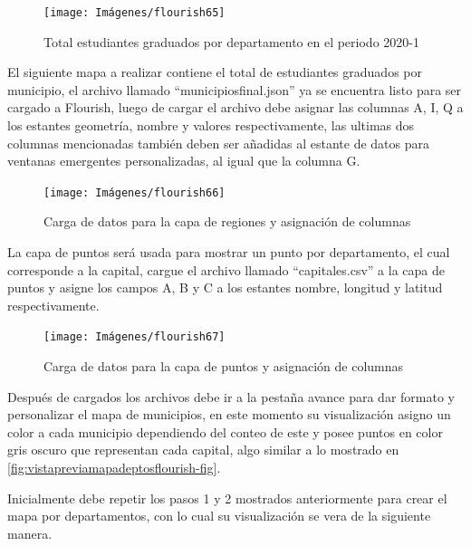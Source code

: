 \documentclass[
]{book}
\begin{document}
\begin{figure}

{\centering \texttt{[image: Imágenes/flourish65]} 

}

\caption{Total estudiantes graduados por departamento en el periodo 2020-1}\label{fig:mapadeptosflourish-fig}
\end{figure}

El siguiente mapa a realizar contiene el total de estudiantes graduados por municipio, el archivo llamado ``municipiosfinal.json'' ya se encuentra listo para ser cargado a Flourish, luego de cargar el archivo debe asignar las columnas A, I, Q a los estantes geometría, nombre y valores respectivamente, las ultimas dos columnas mencionadas también deben ser añadidas al estante de datos para ventanas emergentes personalizadas, al igual que la columna G.

\begin{figure}

{\centering \texttt{[image: Imágenes/flourish66]} 

}

\caption{Carga de datos para la capa de regiones y asignación de columnas}\label{fig:regionesmapampiosfloruish-fig}
\end{figure}

La capa de puntos será usada para mostrar un punto por departamento, el cual corresponde a la capital, cargue el archivo llamado ``capitales.csv'' a la capa de puntos y asigne los campos A, B y C a los estantes nombre, longitud y latitud respectivamente.

\begin{figure}

{\centering \texttt{[image: Imágenes/flourish67]} 

}

\caption{Carga de datos para la capa de puntos y asignación de columnas}\label{fig:puntosmapampiosflourish-fig}
\end{figure}

Después de cargados los archivos debe ir a la pestaña avance para dar formato y personalizar el mapa de municipios, en este momento su visualización asigno un color a cada municipio dependiendo del conteo de este y posee puntos en color gris oscuro que representan cada capital, algo similar a lo mostrado en \ref{fig:vistapreviamapadeptosflourish-fig}.

Inicialmente debe repetir los pasos 1 y 2 mostrados anteriormente para crear el mapa por departamentos, con lo cual su visualización se vera de la siguiente manera.
\end{document}
